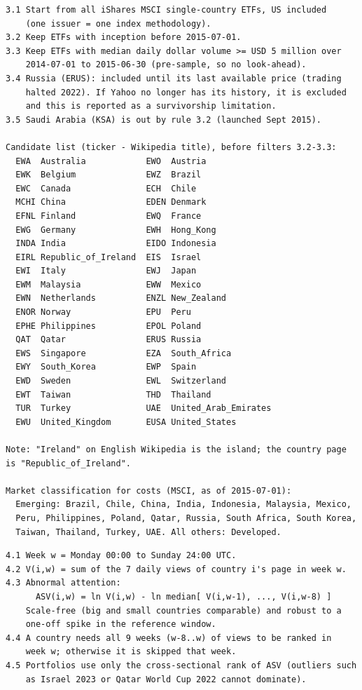\begin{Verbatim}[fontsize=\footnotesize, frame=single, framerule=0.3pt, rulecolor=\color{black!35}, framesep=2.5mm, samepage=true, label={\textcolor{black}{\textbf{3. UNIVERSE (rules fixed before seeing results)}}}]
3.1 Start from all iShares MSCI single-country ETFs, US included
    (one issuer = one index methodology).
3.2 Keep ETFs with inception before 2015-07-01.
3.3 Keep ETFs with median daily dollar volume >= USD 5 million over
    2014-07-01 to 2015-06-30 (pre-sample, so no look-ahead).
3.4 Russia (ERUS): included until its last available price (trading
    halted 2022). If Yahoo no longer has its history, it is excluded
    and this is reported as a survivorship limitation.
3.5 Saudi Arabia (KSA) is out by rule 3.2 (launched Sept 2015).

Candidate list (ticker - Wikipedia title), before filters 3.2-3.3:
  EWA  Australia            EWO  Austria
  EWK  Belgium              EWZ  Brazil
  EWC  Canada               ECH  Chile
  MCHI China                EDEN Denmark
  EFNL Finland              EWQ  France
  EWG  Germany              EWH  Hong_Kong
  INDA India                EIDO Indonesia
  EIRL Republic_of_Ireland  EIS  Israel
  EWI  Italy                EWJ  Japan
  EWM  Malaysia             EWW  Mexico
  EWN  Netherlands          ENZL New_Zealand
  ENOR Norway               EPU  Peru
  EPHE Philippines          EPOL Poland
  QAT  Qatar                ERUS Russia
  EWS  Singapore            EZA  South_Africa
  EWY  South_Korea          EWP  Spain
  EWD  Sweden               EWL  Switzerland
  EWT  Taiwan               THD  Thailand
  TUR  Turkey               UAE  United_Arab_Emirates
  EWU  United_Kingdom       EUSA United_States

Note: "Ireland" on English Wikipedia is the island; the country page
is "Republic_of_Ireland".

Market classification for costs (MSCI, as of 2015-07-01):
  Emerging: Brazil, Chile, China, India, Indonesia, Malaysia, Mexico,
  Peru, Philippines, Poland, Qatar, Russia, South Africa, South Korea,
  Taiwan, Thailand, Turkey, UAE. All others: Developed.
\end{Verbatim}

\begin{Verbatim}[fontsize=\footnotesize, frame=single, framerule=0.3pt, rulecolor=\color{black!35}, framesep=2.5mm, samepage=true, label={\textcolor{black}{\textbf{4. SIGNAL}}}]
4.1 Week w = Monday 00:00 to Sunday 24:00 UTC.
4.2 V(i,w) = sum of the 7 daily views of country i's page in week w.
4.3 Abnormal attention:
      ASV(i,w) = ln V(i,w) - ln median[ V(i,w-1), ..., V(i,w-8) ]
    Scale-free (big and small countries comparable) and robust to a
    one-off spike in the reference window.
4.4 A country needs all 9 weeks (w-8..w) of views to be ranked in
    week w; otherwise it is skipped that week.
4.5 Portfolios use only the cross-sectional rank of ASV (outliers such
    as Israel 2023 or Qatar World Cup 2022 cannot dominate).
\end{Verbatim}

